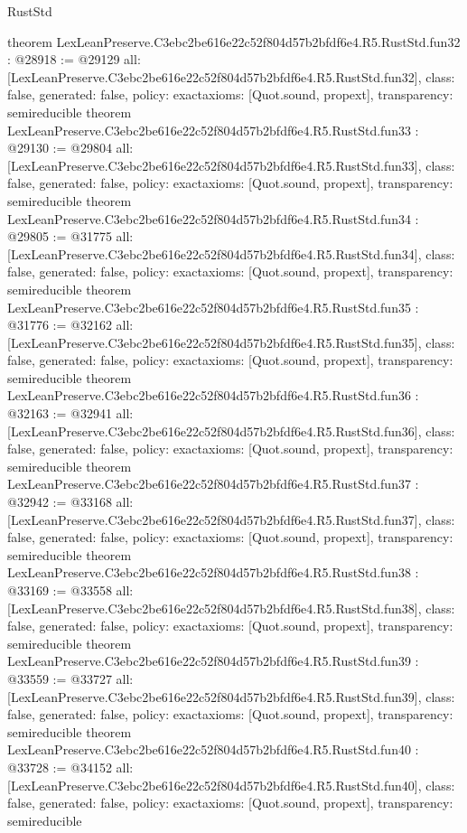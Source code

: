 \begin{lexlean}{RustStd}
\begin{coremodule}
{}
theorem LexLeanPreserve.C3ebc2be616e22c52f804d57b2bfdf6e4.R5.RustStd.fun32 : @28918 := @29129 {
  all: [LexLeanPreserve.C3ebc2be616e22c52f804d57b2bfdf6e4.R5.RustStd.fun32],
  class: false,
  generated: false,
  policy: exact{axioms: [Quot.sound, propext]},
  transparency: semireducible
}
theorem LexLeanPreserve.C3ebc2be616e22c52f804d57b2bfdf6e4.R5.RustStd.fun33 : @29130 := @29804 {
  all: [LexLeanPreserve.C3ebc2be616e22c52f804d57b2bfdf6e4.R5.RustStd.fun33],
  class: false,
  generated: false,
  policy: exact{axioms: [Quot.sound, propext]},
  transparency: semireducible
}
theorem LexLeanPreserve.C3ebc2be616e22c52f804d57b2bfdf6e4.R5.RustStd.fun34 : @29805 := @31775 {
  all: [LexLeanPreserve.C3ebc2be616e22c52f804d57b2bfdf6e4.R5.RustStd.fun34],
  class: false,
  generated: false,
  policy: exact{axioms: [Quot.sound, propext]},
  transparency: semireducible
}
theorem LexLeanPreserve.C3ebc2be616e22c52f804d57b2bfdf6e4.R5.RustStd.fun35 : @31776 := @32162 {
  all: [LexLeanPreserve.C3ebc2be616e22c52f804d57b2bfdf6e4.R5.RustStd.fun35],
  class: false,
  generated: false,
  policy: exact{axioms: [Quot.sound, propext]},
  transparency: semireducible
}
theorem LexLeanPreserve.C3ebc2be616e22c52f804d57b2bfdf6e4.R5.RustStd.fun36 : @32163 := @32941 {
  all: [LexLeanPreserve.C3ebc2be616e22c52f804d57b2bfdf6e4.R5.RustStd.fun36],
  class: false,
  generated: false,
  policy: exact{axioms: [Quot.sound, propext]},
  transparency: semireducible
}
theorem LexLeanPreserve.C3ebc2be616e22c52f804d57b2bfdf6e4.R5.RustStd.fun37 : @32942 := @33168 {
  all: [LexLeanPreserve.C3ebc2be616e22c52f804d57b2bfdf6e4.R5.RustStd.fun37],
  class: false,
  generated: false,
  policy: exact{axioms: [Quot.sound, propext]},
  transparency: semireducible
}
theorem LexLeanPreserve.C3ebc2be616e22c52f804d57b2bfdf6e4.R5.RustStd.fun38 : @33169 := @33558 {
  all: [LexLeanPreserve.C3ebc2be616e22c52f804d57b2bfdf6e4.R5.RustStd.fun38],
  class: false,
  generated: false,
  policy: exact{axioms: [Quot.sound, propext]},
  transparency: semireducible
}
theorem LexLeanPreserve.C3ebc2be616e22c52f804d57b2bfdf6e4.R5.RustStd.fun39 : @33559 := @33727 {
  all: [LexLeanPreserve.C3ebc2be616e22c52f804d57b2bfdf6e4.R5.RustStd.fun39],
  class: false,
  generated: false,
  policy: exact{axioms: [Quot.sound, propext]},
  transparency: semireducible
}
theorem LexLeanPreserve.C3ebc2be616e22c52f804d57b2bfdf6e4.R5.RustStd.fun40 : @33728 := @34152 {
  all: [LexLeanPreserve.C3ebc2be616e22c52f804d57b2bfdf6e4.R5.RustStd.fun40],
  class: false,
  generated: false,
  policy: exact{axioms: [Quot.sound, propext]},
  transparency: semireducible
}
\end{coremodule}
\end{lexlean}
